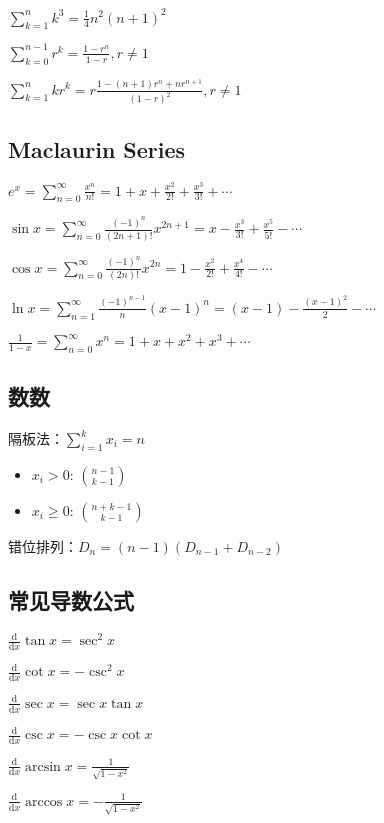 \documentclass[9pt,landscape]{article}
\begin{document}
\begin{multicols}{3}
$\sum_{k=1}^{n}k^3=\frac{1}{4}n^2(n+1)^2$

$\sum_{k=0}^{n-1}r^k=\frac{1-r^n}{1-r}, r\neq 1$

$\sum_{k=1}^{n}kr^k=r\frac{1-(n+1)r^n+nr^{n+1}}{(1-r)^2}, r\neq 1$

\subsection{Maclaurin Series}

$e^x = \sum_{n=0}^{\infty} \frac{x^n}{n!} = 1 + x + \frac{x^2}{2!} + \frac{x^3}{3!} + \cdots$

$\sin x = \sum_{n=0}^{\infty} \frac{(-1)^n}{(2n+1)!}x^{2n+1} = x - \frac{x^3}{3!} + \frac{x^5}{5!} - \cdots$

$\cos x = \sum_{n=0}^{\infty} \frac{(-1)^n}{(2n)!}x^{2n} = 1 - \frac{x^2}{2!} + \frac{x^4}{4!} - \cdots$

$\ln x = \sum_{n=1}^{\infty} \frac{(-1)^{n-1}}{n}(x-1)^n = (x-1) - \frac{(x-1)^2}{2} - \cdots$

$\frac{1}{1-x} = \sum_{n=0}^{\infty} x^n = 1 + x + x^2 + x^3 + \cdots$

\subsection{数数}

隔板法：$\sum_{i=1}^{k} x_i=n$
\begin{itemize}
	\item $x_i>0$: $\binom{n-1}{k-1}$
	\item $x_i\ge 0$: $\binom{n+k-1}{k-1}$
\end{itemize}

错位排列：$D_n=(n-1)\left(D_{n-1}+D_{n-2}\right)$

\subsection{常见导数公式}

$\frac{\mathrm{d}}{\mathrm{d}x}\tan x=\sec ^{2}x$

$\frac{\mathrm{d}}{\mathrm{d}x}\cot x=-\csc ^{2}x$

$\frac{\mathrm{d}}{\mathrm{d}x}\sec x=\sec x\tan x$

$\frac{\mathrm{d}}{\mathrm{d}x}\csc x=-\csc x\cot x$

$\frac{\mathrm{d}}{\mathrm{d}x}\arcsin x={\frac {1}{\sqrt {1-x^{2}}}}$

$\frac{\mathrm{d}}{\mathrm{d}x}\arccos x=-{\frac {1}{\sqrt {1-x^{2}}}}$


\end{multicols}
\end{document}
